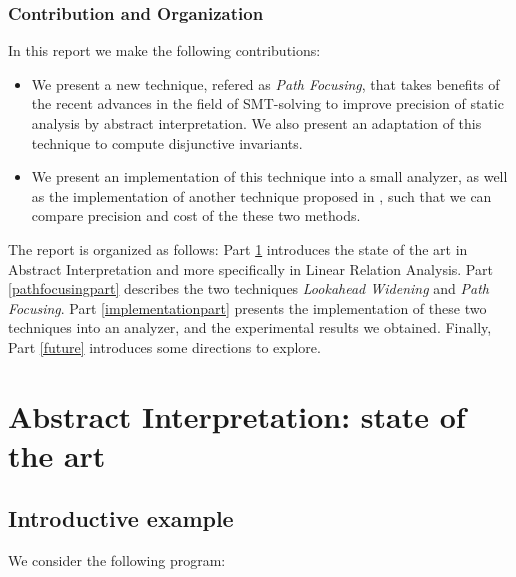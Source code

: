 \documentclass[a4paper,english,titlepage,11pt]{report}
\begin{document}
\subsection*{Contribution and Organization}

In this report we make the following contributions:
\begin{itemize}
\item We present a new technique, refered as \emph{Path Focusing}, that takes
benefits of the recent advances in the field of SMT-solving to improve precision
of static analysis by abstract interpretation. We also present an adaptation of
this technique to compute disjunctive invariants.
\item We present an implementation of this technique into a small analyzer, as
well as the implementation of another technique proposed in \cite{GopanR06},
such that we can compare precision and cost of the these two methods.
\end{itemize}

The report is organized as follows:
Part \ref{stateoftheartpart} introduces the state of the art in Abstract
Interpretation and more specifically in Linear Relation Analysis.
Part \ref{pathfocusingpart} describes the two techniques
\emph{Lookahead Widening} and \emph{Path Focusing}.
Part \ref{implementationpart} presents the implementation of these two
techniques into an analyzer, and the experimental results we obtained.
Finally, Part \ref{future} introduces some directions to explore.

\chapter{Abstract Interpretation: state of the art}
\label{stateoftheartpart}

\section{Introductive example}

We consider the following program:
\end{document}
